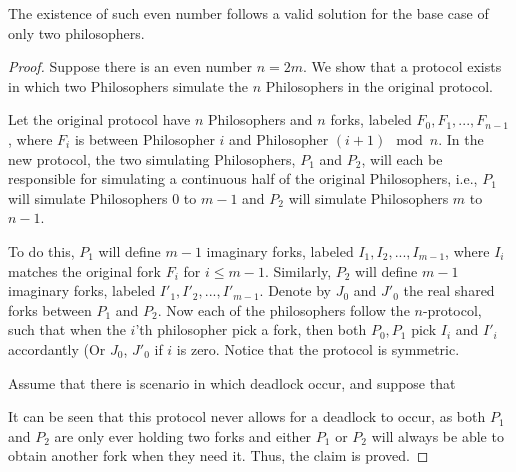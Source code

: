 \documentclass[manuscript,screen,review]{acmart}
\begin{document}
\begin{claim} 
  The existence of such even number follows a valid solution for the base case of only two philosophers.
\end{claim}
\begin{proof}
Suppose there is an even number $n = 2m$. We show that a protocol exists in which two Philosophers simulate the $n$ Philosophers in the original protocol.

Let the original protocol have $n$ Philosophers and $n$ forks, labeled $F_0, F_1, ..., F_{n-1}$, where $F_i$ is between Philosopher $i$ and Philosopher $(i+1) \mod n$. In the new protocol, the two simulating Philosophers, $P_1$ and $P_2$, will each be responsible for simulating a continuous half of the original Philosophers, i.e., $P_1$ will simulate Philosophers $0$ to $m-1$ and $P_2$ will simulate Philosophers $m$ to $n-1$. 

To do this, $P_1$ will define $m-1$ imaginary forks, labeled $I_1, I_2, ..., I_{m-1}$, where $I_i$ matches the original fork $F_{i}$ for $i\le m-1$. Similarly, $P_2$ will define $m-1$ imaginary forks, labeled $I'_1, I'_2, ..., I'_{m-1}$. Denote by $J_{0}$ and $J'_{0}$ the real shared forks between $P_{1}$ and $P_{2}$. Now each of the philosophers follow the $n$-protocol, such that when the $i$'th philosopher pick a fork, then both $P_{0}, P_{1}$ pick $I_{i}$ and $I'_{i}$ accordantly (Or $J_{0}$, $J'_{0}$ if $i$ is zero. Notice that the protocol is symmetric. 

  Assume that there is scenario in which deadlock occur, and suppose that 

It can be seen that this protocol never allows for a deadlock to occur, as both $P_1$ and $P_2$ are only ever holding two forks and either $P_1$ or $P_2$ will always be able to obtain another fork when they need it. Thus, the claim is proved.

\end{proof}




% 
\printbibliography
\end{document}
